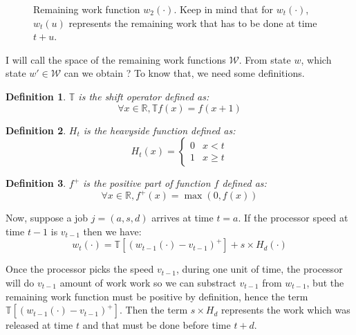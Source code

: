 \documentclass[
10pt, %
a4paper, %
oneside, %
headinclude,footinclude, %
BCOR5mm, %
]{scrartcl}
\newcommand{\T}{\mathbb{T}}
\newcommand{\W}{\mathcal{W}}
\newcommand{\R}{\mathbb{R}}
\newtheorem{defi}{Definition}
\begin{document}
\begin{figure}
  \centering
  \caption{Remaining work function $w_2(\cdot)$.
    Keep in mind that for $w_t(\cdot)$, $w_t(u)$ represents the
  remaining work that has to be done at time $t+u$.}
  \label{fig:workfun}
\end{figure}



I will call the space of the remaining work functions $\W$. From state
$w$, which state $w'\in\W$ can we obtain ? To know that, we need some
definitions.

\begin{defi}
  $\T$ is the shift operator defined as:
  \[ \forall x\in\R,\T f(x) = f(x+1)\]
\end{defi}

\begin{defi}
  $H_t$ is the heavyside function defined as:
  \[ H_t(x) =
    \begin{cases}
      0 & x<t \\
      1 & x\geq t
    \end{cases}
  \]
\end{defi}

\begin{defi}
  $f^+$ is the positive part of function $f$ defined as:
  \[
    \forall x\in\R, f^+(x)=\max(0,f(x))
  \]
\end{defi}

Now, suppose a job $j=(a,s,d)$ arrives at time $t=a$. If the processor
speed at time $t-1$ is $v_{t-1}$ then we have:
\begin{equation}
  \label{eq:nextw}
  w_t(\cdot)=\T[(w_{t-1}(\cdot)-v_{t-1})^+]+s\times H_d(\cdot)
\end{equation}

Once the processor picks the speed $v_{t-1}$, during one unit of time,
the processor will do $v_{t-1}$ amount of work work so we can
substract $v_{t-1}$ from
$w_{t-1}$, but the remaining work function must be positive by
definition, hence the term $\T[(w_{t-1}(\cdot)-v_{t-1})^+]$. Then the
term $s\times H_d$ represents the work which was released at time
$t$ and that must be done before time $t+d$.\\
\end{document}
